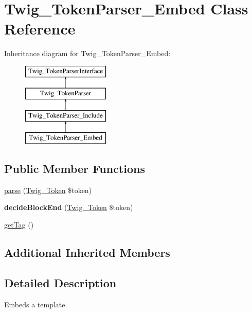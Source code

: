 \hypertarget{class_twig___token_parser___embed}{}\section{Twig\+\_\+\+Token\+Parser\+\_\+\+Embed Class Reference}
\label{class_twig___token_parser___embed}
Inheritance diagram for Twig\+\_\+\+Token\+Parser\+\_\+\+Embed\+:\begin{figure}[H]
\begin{center}
\leavevmode
\includegraphics[height=4.000000cm]{class_twig___token_parser___embed}
\end{center}
\end{figure}
\subsection*{Public Member Functions}
\begin{DoxyCompactItemize}
\item 
\hyperlink{class_twig___token_parser___embed_a5dfa2e269321584fb74e8b43dabe0efd}{parse} (\hyperlink{class_twig___token}{Twig\+\_\+\+Token} \$token)
\item 
\hypertarget{class_twig___token_parser___embed_aa976dc013d35c2813752149bacd88902}{}{\bfseries decide\+Block\+End} (\hyperlink{class_twig___token}{Twig\+\_\+\+Token} \$token)\label{class_twig___token_parser___embed_aa976dc013d35c2813752149bacd88902}

\item 
\hyperlink{class_twig___token_parser___embed_ab86ba36154b20e6bbfa3ba705f12f9d6}{get\+Tag} ()
\end{DoxyCompactItemize}
\subsection*{Additional Inherited Members}


\subsection{Detailed Description}
Embeds a template. 

